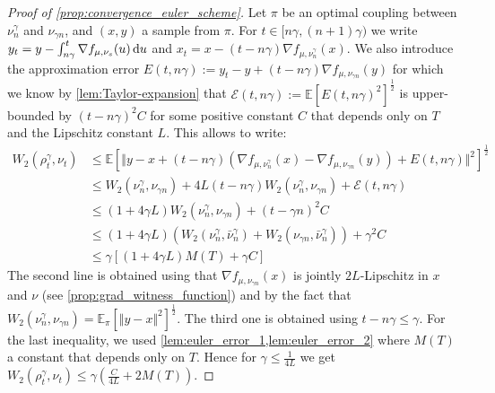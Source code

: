 \begin{proof}[Proof of \cref{prop:convergence_euler_scheme}]\label{proof:prop:convergence_euler_scheme}
Let $\pi$ be an optimal coupling between $\nu_{n}^{\gamma}$ and $\nu_{\gamma n}$,
and $(x,y)$ a sample from $\pi$. For $t\in[n\gamma,(n+1)\gamma)$ we write $y_{t} =y-\int_{n\gamma}^{t}\nabla f_{\mu,\nu_{s}}(u)\mathop{}\!\mathrm{d} u$ and $x_{t}  =x-(t-n\gamma)\nabla f_{\mu,\nu_{n}^{\gamma}}(x)$. We also introduce the approximation error $  E(t,n\gamma):=y_{t}-y+(t-n\gamma)\nabla f_{\mu,\nu_{\gamma n}}(y)$ for which we know by  \cref{lem:Taylor-expansion} that $\mathcal{E}(t,n\gamma):=\mathbb{E}[E(t,n\gamma)^2]^{\frac{1}{2}}$ is upper-bounded by $(t-n\gamma)^{2}C$ for some positive constant $C$ that depends only on $T$ and the Lipschitz constant $L$. This allows to write:
\begin{align*}
W_{2}(\rho_{t}^{\gamma},\nu_{t}) & \leq\mathbb{E}\left[\Vert y-x+(t-n\gamma)(\nabla f_{\mu,\nu_{n}^{\gamma}}(x)-\nabla f_{\mu,\nu_{\gamma n}}(y))+E(t,n\gamma)\Vert^{2}\right]^{\frac{1}{2}}\\
 & \leq W_{2}(\nu_{n}^{\gamma},\nu_{\gamma n})+4L(t-n\gamma)W_{2}(\nu_{n}^{\gamma},\nu_{\gamma n})+\mathcal{E}(t,n\gamma)\\
 & \leq(1+4\gamma L)W_{2}(\nu_{n}^{\gamma},\nu_{\gamma n})+(t-\gamma n)^2C\\ &\leq(1+4\gamma L)( W_{2}(\nu_{n}^{\gamma},\bar{\nu}_{n}^{\gamma})+W_{2}(\nu_{\gamma n},\bar{\nu}_{n}^{\gamma}) )+\gamma^{2}C \\
 & \leq\gamma\left[(1+4\gamma L)M(T)+\gamma C\right]
\end{align*}
The second line is obtained using that $\nabla f_{\mu,\nu_{\gamma n}}(x)$ is jointly $2L$-Lipschitz in $x$  and $\nu$ (see \cref{prop:grad_witness_function}) and by the fact that $W_{2}(\nu_{n}^{\gamma},\nu_{\gamma n}) = \mathbb{E}_{\pi}[\Vert y-x\Vert^2]^{\frac12}$. The third one is obtained using $t-n \gamma\le \gamma$. For the last inequality, we used \cref{lem:euler_error_1,lem:euler_error_2}  where $M(T)$ a constant that depends only on $T$. Hence for $\gamma\leq\frac{1}{4L}$ we get $W_{2}(\rho_{t}^{\gamma},\nu_{t})\leq\gamma(\frac{C}{4L}+2M(T)).$
\end{proof}

